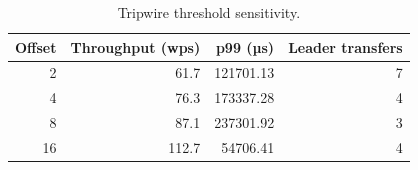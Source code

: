 \begin{table}[t]
\centering
\caption{Tripwire threshold sensitivity.}
\label{tab:threshold}
\small
\begin{tabular}{r r r r}
\toprule
\textbf{Offset} & \textbf{Throughput (wps)} & \textbf{p99 (µs)} & \textbf{Leader transfers} \\
\midrule
2 & 61.7 & 121701.13 & 7 \\
4 & 76.3 & 173337.28 & 4 \\
8 & 87.1 & 237301.92 & 3 \\
16 & 112.7 & 54706.41 & 4 \\
\bottomrule
\end{tabular}
\end{table}